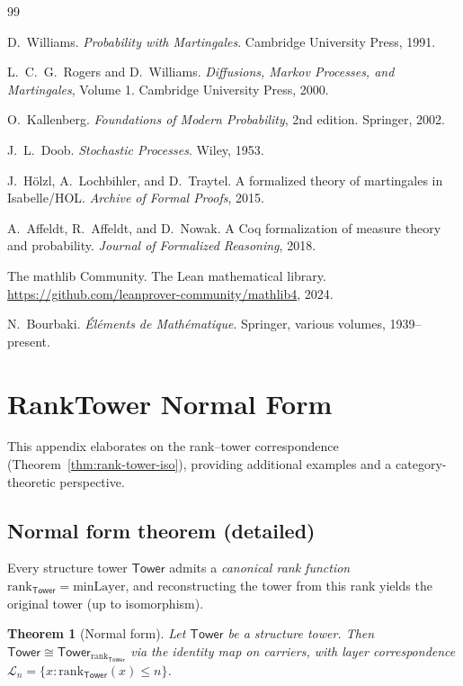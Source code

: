 \documentclass[11pt]{article}
\newtheorem{theorem}{Theorem}[section]
\theoremstyle{definition}
\theoremstyle{remark}
\newcommand{\layer}{\mathcal{L}}
\newcommand{\minLayer}{\mathrm{minLayer}}
\newcommand{\rank}{\mathrm{rank}}
\newcommand{\Tower}{\mathsf{Tower}}
\begin{document}
\begin{thebibliography}{99}

D.~Williams.
\textit{Probability with Martingales}.
Cambridge University Press, 1991.

L.~C.~G.~Rogers and D.~Williams.
\textit{Diffusions, Markov Processes, and Martingales}, Volume 1.
Cambridge University Press, 2000.

O.~Kallenberg.
\textit{Foundations of Modern Probability}, 2nd edition.
Springer, 2002.

J.~L.~Doob.
\textit{Stochastic Processes}.
Wiley, 1953.

J.~Hölzl, A.~Lochbihler, and D.~Traytel.
A formalized theory of martingales in Isabelle/HOL.
\textit{Archive of Formal Proofs}, 2015.

A.~Affeldt, R.~Affeldt, and D.~Nowak.
A Coq formalization of measure theory and probability.
\textit{Journal of Formalized Reasoning}, 2018.

The mathlib Community.
The Lean mathematical library.
\url{https://github.com/leanprover-community/mathlib4}, 2024.

N.~Bourbaki.
\textit{Éléments de Mathématique}.
Springer, various volumes, 1939--present.

\end{thebibliography}

\newpage
\appendix

\section{RankTower Normal Form}
\label{app:normal-form}

This appendix elaborates on the rank--tower correspondence (Theorem~\ref{thm:rank-tower-iso}), providing additional examples and a category-theoretic perspective.

\subsection{Normal form theorem (detailed)}

Every structure tower $\Tower$ admits a \emph{canonical rank function} $\rank_\Tower = \minLayer$, and reconstructing the tower from this rank yields the original tower (up to isomorphism).

\begin{theorem}[Normal form]
\label{thm:normal-form-detailed}
Let $\Tower$ be a structure tower.
Then $\Tower \cong \Tower_{\rank_\Tower}$ via the identity map on carriers, with layer correspondence $\layer_n = \{x : \rank_\Tower(x) \leq n\}$.
\end{theorem}
\end{document}
